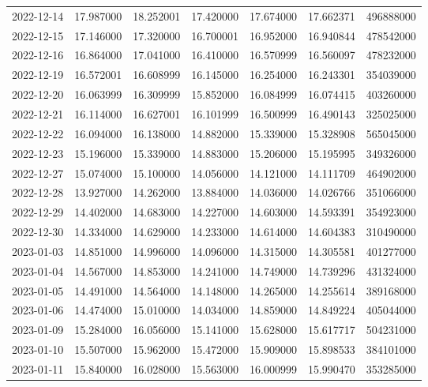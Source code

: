 \begin{tabular}{lrrrrrr}
2022-12-14 &   17.987000 &   18.252001 &   17.420000 &   17.674000 &   17.662371 &   496888000 \\
2022-12-15 &   17.146000 &   17.320000 &   16.700001 &   16.952000 &   16.940844 &   478542000 \\
2022-12-16 &   16.864000 &   17.041000 &   16.410000 &   16.570999 &   16.560097 &   478232000 \\
2022-12-19 &   16.572001 &   16.608999 &   16.145000 &   16.254000 &   16.243301 &   354039000 \\
2022-12-20 &   16.063999 &   16.309999 &   15.852000 &   16.084999 &   16.074415 &   403260000 \\
2022-12-21 &   16.114000 &   16.627001 &   16.101999 &   16.500999 &   16.490143 &   325025000 \\
2022-12-22 &   16.094000 &   16.138000 &   14.882000 &   15.339000 &   15.328908 &   565045000 \\
2022-12-23 &   15.196000 &   15.339000 &   14.883000 &   15.206000 &   15.195995 &   349326000 \\
2022-12-27 &   15.074000 &   15.100000 &   14.056000 &   14.121000 &   14.111709 &   464902000 \\
2022-12-28 &   13.927000 &   14.262000 &   13.884000 &   14.036000 &   14.026766 &   351066000 \\
2022-12-29 &   14.402000 &   14.683000 &   14.227000 &   14.603000 &   14.593391 &   354923000 \\
2022-12-30 &   14.334000 &   14.629000 &   14.233000 &   14.614000 &   14.604383 &   310490000 \\
2023-01-03 &   14.851000 &   14.996000 &   14.096000 &   14.315000 &   14.305581 &   401277000 \\
2023-01-04 &   14.567000 &   14.853000 &   14.241000 &   14.749000 &   14.739296 &   431324000 \\
2023-01-05 &   14.491000 &   14.564000 &   14.148000 &   14.265000 &   14.255614 &   389168000 \\
2023-01-06 &   14.474000 &   15.010000 &   14.034000 &   14.859000 &   14.849224 &   405044000 \\
2023-01-09 &   15.284000 &   16.056000 &   15.141000 &   15.628000 &   15.617717 &   504231000 \\
2023-01-10 &   15.507000 &   15.962000 &   15.472000 &   15.909000 &   15.898533 &   384101000 \\
2023-01-11 &   15.840000 &   16.028000 &   15.563000 &   16.000999 &   15.990470 &   353285000 \\

\end{tabular}
